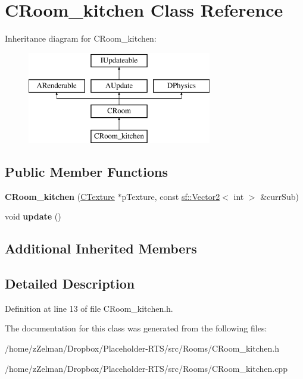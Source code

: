 \hypertarget{classCRoom__kitchen}{\section{C\-Room\-\_\-kitchen Class Reference}
\label{classCRoom__kitchen}
}
Inheritance diagram for C\-Room\-\_\-kitchen\-:\begin{figure}[H]
\begin{center}
\leavevmode
\includegraphics[height=4.000000cm]{classCRoom__kitchen}
\end{center}
\end{figure}
\subsection*{Public Member Functions}
\begin{DoxyCompactItemize}
\item 
\hypertarget{classCRoom__kitchen_a7bd53e1d99fe708b7db022737be97dbf}{{\bfseries C\-Room\-\_\-kitchen} (\hyperlink{classCTexture}{C\-Texture} $\ast$p\-Texture, const \hyperlink{classsf_1_1Vector2}{sf\-::\-Vector2}$<$ int $>$ \&curr\-Sub)}\label{classCRoom__kitchen_a7bd53e1d99fe708b7db022737be97dbf}

\item 
\hypertarget{classCRoom__kitchen_a6c3ad2d5a04a0b1ed566e6d1108a923c}{void {\bfseries update} ()}\label{classCRoom__kitchen_a6c3ad2d5a04a0b1ed566e6d1108a923c}

\end{DoxyCompactItemize}
\subsection*{Additional Inherited Members}


\subsection{Detailed Description}


Definition at line 13 of file C\-Room\-\_\-kitchen.\-h.



The documentation for this class was generated from the following files\-:\begin{DoxyCompactItemize}
\item 
/home/z\-Zelman/\-Dropbox/\-Placeholder-\/\-R\-T\-S/src/\-Rooms/C\-Room\-\_\-kitchen.\-h\item 
/home/z\-Zelman/\-Dropbox/\-Placeholder-\/\-R\-T\-S/src/\-Rooms/C\-Room\-\_\-kitchen.\-cpp\end{DoxyCompactItemize}
